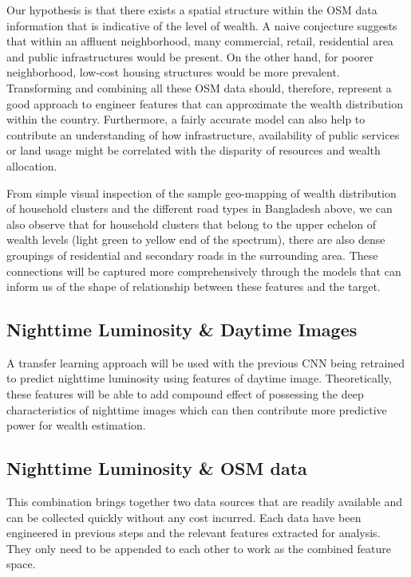 \documentclass[solid,math,chem,code,plot,gloss]{bmc}
\begin{document}
Our hypothesis is that there exists a spatial structure within the OSM data information that is indicative of the level of wealth. A naive conjecture suggests that within an affluent neighborhood, many commercial, retail, residential area and public infrastructures would be present. On the other hand, for poorer neighborhood, low-cost housing structures would be more prevalent. Transforming and combining all these OSM data should, therefore, represent a good approach to engineer features that can approximate the wealth distribution within the country. Furthermore, a fairly accurate model can also help to contribute an understanding of how infrastructure, availability of public services or land usage might be correlated with the disparity of resources and wealth allocation. 

From simple visual inspection of the sample geo-mapping of wealth distribution of household clusters and the different road types in Bangladesh above, we can also observe that for household clusters that belong to the upper echelon of wealth levels (light green to yellow end of the spectrum), there are also dense groupings of residential and secondary roads in the surrounding area. These connections will be captured more comprehensively through the models that can inform us of the shape of relationship between these features and the target. 

\subsection{Nighttime Luminosity \& Daytime Images}

A transfer learning approach will be used with the previous CNN being retrained to predict nighttime luminosity using features of daytime image. Theoretically, these features will be able to add compound effect of possessing the deep characteristics of nighttime images which can then contribute more predictive power for wealth estimation. 

\subsection{Nighttime Luminosity \& OSM data}

This combination brings together two data sources that are readily available and can be collected quickly without any cost incurred. Each data have been engineered in previous steps and the relevant features extracted for analysis. They only need to be appended to each other to work as the combined feature space. 
\end{document}
